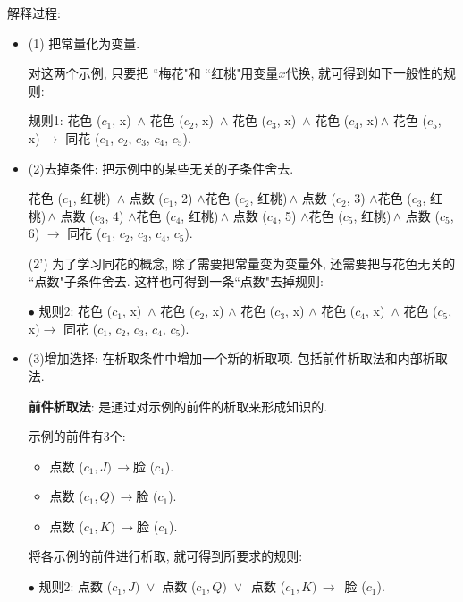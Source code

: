 解释过程:
\begin{itemize}
\item (1) 把常量化为变量.
\begin{example}
对这两个示例, 只要把 ``梅花"和 ``红桃"用变量$x$代换, 就可得到如下一般性的规则:

    规则1: 花色 ($c_1$, x)\, $\wedge$ 花色 ($c_2$, x)\, $\wedge$ 花色 ($c_3$, x)\, $\wedge$ 花色 ($c_4$, x)\,$\wedge$ 花色 ($c_5$, x)\,$\rightarrow$ 同花 ($c_1$, $c_2$, $c_3$, $c_4$, $c_5$).
\end{example}

\item (2)去掉条件: 把示例中的某些无关的子条件舍去.

\begin{example}
  花色 ($c_1$, 红桃)\, $\wedge$ 点数 ($c_1$, 2)
            $\wedge$花色 ($c_2$, 红桃)\,$\wedge$ 点数 ($c_2$, 3)
            $\wedge$花色 ($c_3$, 红桃)\,$\wedge$ 点数 ($c_3$, 4)
            $\wedge$花色 ($c_4$, 红桃)\,$\wedge$ 点数 ($c_4$, 5)
            $\wedge$花色 ($c_5$, 红桃)\,$\wedge$ 点数 ($c_5$, 6)
          $\rightarrow$ 同花 ($c_1$, $c_2$, $c_3$, $c_4$, $c_5$).
\end{example}

(2') 为了学习同花的概念, 除了需要把常量变为变量外, 还需要把与花色无关的 ``点数"子条件舍去. 这样也可得到一条``点数"去掉规则:

$\bullet$ 规则2: 花色 ($c_1$, x)\, $\wedge$ 花色 ($c_2$, x) $\wedge$ 花色 ($c_3$, x) $\wedge$ 花色 ($c_4$, x)\, $\wedge$ 花色 ($c_5$, x)$\rightarrow$ 同花 ($c_1$, $c_2$, $c_3$, $c_4$, $c_5$).

\item (3)增加选择: 在析取条件中增加一个新的析取项. 包括前件析取法和内部析取法.

 \textbf{前件析取法}: 是通过对示例的前件的析取来形成知识的.

\begin{example}\label{AIC7MLexam7.7}
示例的前件有3个:
\begin{itemize}
\item 点数 ($c_1, J)\,\rightarrow$脸 ($c_1$).
\item 点数 ($c_1, Q)\,\rightarrow$脸 ($c_1$).
\item 点数 ($c_1, K)\,\rightarrow$脸 ($c_1$).
\end{itemize}

将各示例的前件进行析取, 就可得到所要求的规则:
\begin{center}
    $\bullet$ 规则2: 点数 ($c_1, J)\,\, \vee$ 点数 ($c_1, Q)\,\, \vee$\, 点数 ($c_1, K)\, \rightarrow$\, 脸 ($c_1$).
\end{center}
\end{example}


\end{itemize}
